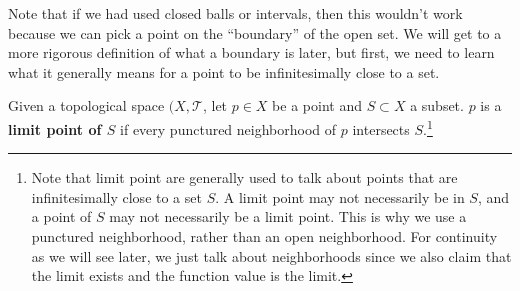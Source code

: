 \documentclass{article}
\begin{document}
    Note that if we had used closed balls or intervals, then this wouldn't work because we can pick a point on the ``boundary'' of the open set. We will get to a more rigorous definition of what a boundary is later, but first, we need to learn what it generally means for a point to be infinitesimally close to a set. 

    \begin{definition}
      Given a topological space $(X, \mathscr{T}$, let $p \in X$ be a point and $S \subset X$ a subset. $p$ is a \textbf{limit point of $S$} if every punctured neighborhood of $p$ intersects $S$.\footnote{Note that limit point are generally used to talk about points that are infinitesimally close to a set $S$. A limit point may not necessarily be in $S$, and a point of $S$ may not necessarily be a limit point. This is why we use a punctured neighborhood, rather than an open neighborhood. For continuity as we will see later, we just talk about neighborhoods since we also claim that the limit exists and the function value is the limit.} 
    \end{definition}
\end{document}
